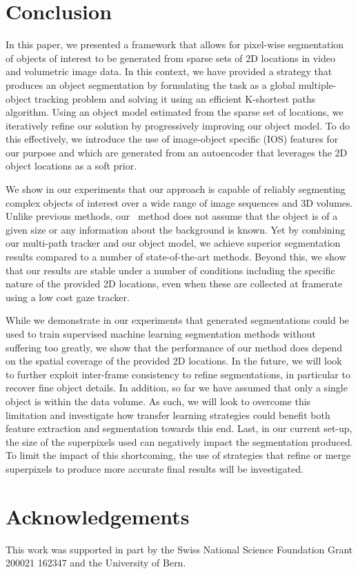 \section{Conclusion}
\label{sec:conclusion}
In this paper, we presented a framework that allows for pixel-wise segmentation of objects of interest to be generated from sparse sets of 2D locations in video and volumetric image data. In this context, we have provided a strategy that produces an object segmentation by formulating the task as a global multiple-object tracking problem and solving it using an efficient K-shortest paths algorithm. Using an object model estimated from the sparse set of locations, we iteratively refine our solution by progressively improving our object model. To do this effectively, we introduce the use of image-object specific (IOS) features for our purpose and which are generated from an autoencoder that leverages the 2D object locations as a soft prior. 

We show in our experiments that our approach is capable of reliably segmenting complex objects of interest over a wide range of image sequences and 3D volumes. Unlike previous methods, our \KSP ~method does not assume that the object is of a given size or any information about the background is known. Yet by combining our multi-path tracker and our object model, we achieve superior segmentation results compared to a number of state-of-the-art methods. Beyond this, we show that our results are stable under a number of conditions including the specific nature of the provided 2D locations, even when these are collected at framerate using a low cost gaze tracker.

While we demonstrate in our experiments that generated segmentations could be used to train supervised machine learning segmentation methods without suffering too greatly, we show that the performance of our method does depend on the spatial coverage of the provided 2D locations. In the future, we will look to further exploit inter-frame consistency to refine segmentations, in particular to recover fine object details. In addition, so far we have assumed that only a single object is within the data volume. As such, we will look to overcome this limitation and investigate how transfer learning strategies could benefit both feature extraction and segmentation towards this end. Last, in our current set-up, the size of the superpixels used can negatively impact the segmentation produced. To limit the impact of this shortcoming, the use of strategies that refine or merge superpixels to produce more accurate final results will be investigated.

\section*{Acknowledgements}
This work was supported in part by the Swiss National Science Foundation Grant 200021 162347 and the University of Bern.

